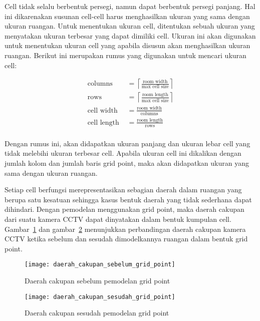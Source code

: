 Cell tidak selalu berbentuk persegi, namun dapat berbentuk persegi panjang. Hal ini dikarenakan susunan cell-cell harus menghasilkan ukuran yang sama dengan ukuran ruangan. Untuk menentukan ukuran cell, ditentukan sebuah ukuran yang menyatakan ukuran terbesar yang dapat dimiliki cell. Ukuran ini akan digunakan untuk menentukan ukuran cell yang apabila disusun akan menghasilkan ukuran ruangan. Berikut ini merupakan rumus yang digunakan untuk mencari ukuran cell:

\begin{equation*}
	\begin{split}
		\text{columns }&= \left\lceil\frac{\text{room width}}{\text{max cell size}}\right\rceil\\
		\text{rows }&= \left\lceil\frac{\text{room length}}{\text{max cell size}}\right\rceil\\
		\text{cell width }&= \frac{\text{room width}}{\text{columns}}\\
		\text{cell length }&= \frac{\text{room length}}{\text{rows}}\\
	\end{split}
\end{equation*}

Dengan rumus ini, akan didapatkan ukuran panjang dan ukuran lebar cell yang tidak melebihi ukuran terbesar cell. Apabila ukuran cell ini dikalikan dengan jumlah kolom dan jumlah baris grid point, maka akan didapatkan ukuran yang sama dengan ukuran ruangan.

Setiap cell berfungsi merepresentasikan sebagian daerah dalam ruangan yang berupa satu kesatuan sehingga kasus bentuk daerah yang tidak sederhana dapat dihindari. Dengan pemodelan menggunakan grid point, maka daerah cakupan dari suatu kamera CCTV dapat dinyatakan dalam bentuk kumpulan cell. Gambar~\ref{fig:daerah_cakupan_sebelum_grid_point} dan gambar~\ref{fig:daerah_cakupan_sesudah_grid_point} menunjukkan perbandingan daerah cakupan kamera CCTV ketika sebelum dan sesudah dimodelkannya ruangan dalam bentuk grid point.

\begin{figure}[h]
	\centering  
	\texttt{[image: daerah\_cakupan\_sebelum\_grid\_point]}
	\caption[Daerah cakupan sebelum pemodelan grid point]{Daerah cakupan sebelum pemodelan grid point}
	\label{fig:daerah_cakupan_sebelum_grid_point}
\end{figure}

\begin{figure}[h]
	\centering  
	\texttt{[image: daerah\_cakupan\_sesudah\_grid\_point]}
	\caption[Daerah cakupan sesudah pemodelan grid point]{Daerah cakupan sesudah pemodelan grid point}
	\label{fig:daerah_cakupan_sesudah_grid_point}
\end{figure}

